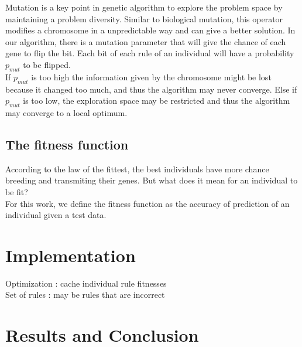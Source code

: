 \documentclass[a4paper,12pt]{article}
\begin{document}
Mutation is a key point in genetic algorithm to explore the problem space by maintaining a problem diversity. Similar to biological mutation, this operator modifies a chromosome in a unpredictable way and can give a better solution.
In our algorithm, there is a mutation parameter that will give the chance of each gene to flip the bit. Each bit of each rule of an individual will have a probability $p_{mut}$ to be flipped.\\
If $p_{mut}$ is too high the information given by the chromosome might be lost because it changed too much, and thus the algorithm may never converge. Else if $p_{mut}$ is too low, the exploration space may be restricted and thus the algorithm may converge to a local optimum.


\subsection{The fitness function}

According to the law of the fittest, the best individuals have more chance breeding and transmiting their genes. But what does it mean for an individual to be fit?\\
For this work, we define the fitness function as the accuracy of prediction of an individual given a test data.

\section{Implementation}

Optimization : cache individual rule fitnesses\\
Set of rules : may be rules that are incorrect 

\section{Results and Conclusion}



\end{document}

